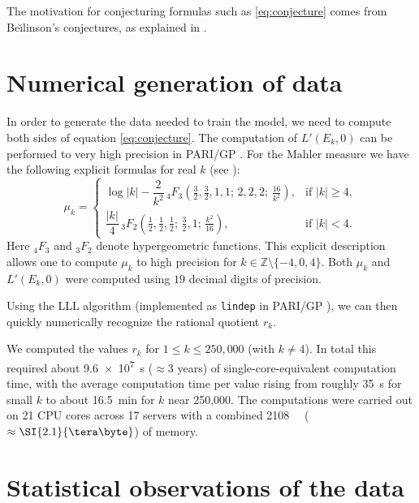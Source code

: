 \documentclass[12pt]{amsart}%
\newcommand{\1}{\mathds{1}}
\newcommand{\Z}{\mathbb{Z}}
\theoremstyle{definition}
\numberwithin{equation}{section}
\numberwithin{table}{section}
\numberwithin{figure}{section}
\begin{document}
The motivation for conjecturing formulas such as \eqref{eq:conjecture} comes from Be\u\i linson's conjectures, as explained in \cite{Bo98,Deninger,RV}.


\section{Numerical generation of data}
\label{sec:data-generation}

In order to generate the data needed to train the model, we need to compute both sides of equation \eqref{eq:conjecture}.
The computation of $L'(E_k,0)$ can be performed to very high precision in
\textsc{PARI/GP} \cite{PARI}. For the Mahler measure we have the following explicit formulas for real $k$
(see \cite[p.~2324]{RZ14}):
\begin{equation}
\label{HG}
\mu_k =
\begin{cases}
\log |k| - \dfrac{2}{k^2}\,
{}_4F_3\!\left(\frac{3}{2}, \frac{3}{2}, 1, 1;\, 2, 2, 2;\, \frac{16}{k^2}\right),
& \text{if } |k| \ge 4, \\[6pt]
\dfrac{|k|}{4}\,
{}_3F_2\!\left(\frac{1}{2}, \frac{1}{2}, \frac{1}{2};\, \frac{3}{2}, 1;\, \frac{k^2}{16}\right),
& \text{if } |k| < 4 .
\end{cases}
\end{equation}
Here ${}_4F_3$ and ${}_3F_2$ denote hypergeometric functions. This explicit
description allows one to compute $\mu_k$ to high precision for
$k \in \Z \setminus\{-4, 0, 4\}$. Both $\mu_k$ and $L'(E_k,0)$ were computed using $19$ decimal digits of precision.

Using the LLL algorithm (implemented as \texttt{lindep} in \textsc{PARI/GP}
\cite{PARI}), we can then quickly numerically recognize the rational quotient $r_k$.


We computed the values $r_k$ for $1 \le k \le 250{,}000$ (with $k \neq 4$).
In total this required about \SI{9.6e7}{\second} ($\approx 3$ years) of
single-core-equivalent computation time, with the average computation time per value rising
from roughly \SI{35}{\second} for small $k$ to about \SI{16.5}{\minute} for
$k$ near 250{,}000. The computations were carried out on 21 CPU cores
across 17 servers with a combined \SI{2108}{\giga\byte} ($\approx
\SI{2.1}{\tera\byte}$) of memory.

\section{Statistical observations of the data}
\label{sec:statistics}
\end{document}
